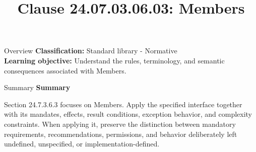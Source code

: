 \documentclass[10pt,letterpaper]{article}
\title{Clause 24.07.03.06.03: Members}
\author{}
\date{}
\begin{document}
\maketitle
\begin{CornellOverviewBox}{Overview}
\textbf{Classification:} Standard library - Normative\\[2pt]
\textbf{Learning objective:} Understand the rules, terminology, and semantic consequences associated with Members.
\end{CornellOverviewBox}\begin{CornellSummaryBox}{Summary}
{\sffamily\bfseries\color{Accent} Summary}\par\vspace{3pt}Section 24.7.3.6.3 focuses on Members. Apply the specified interface together with its mandates, effects, result conditions, exception behavior, and complexity constraints. When applying it, preserve the distinction between mandatory requirements, recommendations, permissions, and behavior deliberately left undefined, unspecified, or implementation-defined.
\end{CornellSummaryBox}
\end{document}
